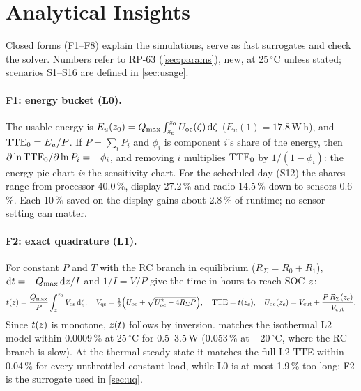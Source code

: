 \section{Analytical Insights}\label{sec:analytic}
Closed forms (F1--F8) explain the simulations, serve as fast surrogates and check the solver. Numbers refer to
RP-63 (\cref{sec:params}), new, at 25\,$^\circ$C unless stated; scenarios S1--S16 are defined in
\cref{sec:usage}.

\paragraph{F1: energy bucket (L0).}
The usable energy is $E_u(z_0)=Q_{\max}\int_{z_e}^{z_0}U_{\mathrm{oc}}(\zeta)\,\mathrm{d}\zeta$ ($E_u(1)=17.8$\,W\,h), and
$\mathrm{TTE}_0=E_u/\bar P$. If $P=\sum_iP_i$ and $\phi_i$ is component $i$'s share of the energy, then
$\partial\ln\mathrm{TTE}_0/\partial\ln P_i=-\phi_i$, and removing $i$ multiplies $\mathrm{TTE}_0$ by $1/(1-\phi_i)$: the energy pie
chart \emph{is} the sensitivity chart. For the scheduled day (S12) the shares range from processor 40.0\,\%,
display 27.2\,\% and radio 14.5\,\% down to sensors 0.6\,\%. Each 10\,\% saved on the display gains about 2.8\,\% of runtime; no
sensor setting can matter.

\paragraph{F2: exact quadrature (L1).}
For constant $P$ and $T$ with the RC branch in equilibrium ($R_\Sigma=R_0+R_1$), $\mathrm{d} t=-Q_{\max}\,\mathrm{d}z/I$ and
$1/I=V/P$ give the time in hours to reach SOC $z$:
\begin{equation}
  t(z)=\frac{Q_{\max}}{P}\int_{z}^{z_0}V_{\mathrm{qs}}\,\mathrm{d}\zeta,\quad
  V_{\mathrm{qs}}=\tfrac12\Big(U_{\mathrm{oc}}+\sqrt{U_{\mathrm{oc}}^2-4R_\Sigma P}\Big),\quad
  \mathrm{TTE}=t(z_c),\quad U_{\mathrm{oc}}(z_c)=V_{\mathrm{cut}}+\frac{P\,R_\Sigma(z_c)}{V_{\mathrm{cut}}}. \label{eq:F2}
\end{equation}
Since $t(z)$ is monotone, $z(t)$ follows by inversion.  matches the isothermal L2 model within
0.0009\,\% at 25\,$^\circ$C for 0.5--3.5\,W (0.053\,\% at $-20\,^\circ$C, where the RC branch is slow). At the thermal steady state it matches the full
L2 TTE within 0.04\,\% for every unthrottled constant load, while L0 is at most 1.9\,\% too long; F2 is the
surrogate used in \cref{sec:uq}.

